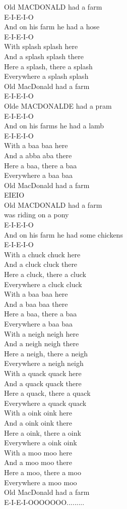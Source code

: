 \documentclass[a4paper,10pt]{article}
\begin{document}
Old MACDONALD had a farm \\
E-I-E-I-O \\
And on his farm he had a hose \\
E-I-E-I-O \\
With splash splash here \\
And a splash splash there \\
Here a splash, there a splash \\
Everywhere a splash splash \\
Old MacDonald had a farm \\
E-I-E-I-O \\

Olde MACDONALDE had a pram \\
E-I-E-I-O\\
And on his farms he had a lamb\\
E-I-E-I-O\\
With a baa baa here\\
And a abba aba there\\
Here a baa, there a baa\\
Everywhere a baa baa\\
Old MacDonald had a farm\\
EIEIO\\

Old MACDONALD had a farm\\
was riding on a pony\\
E-I-E-I-O\\
And on his farm he had some chickens\\
E-I-E-I-O\\
With a chuck chuck here\\
And a cluck cluck there\\
Here a cluck, there a cluck\\
Everywhere a cluck cluck\\
With a baa baa here\\
And a baa baa there\\
Here a baa, there a baa\\
Everywhere a baa baa\\
With a neigh neigh here\\
And a neigh neigh there\\
Here a neigh, there a neigh\\
Everywhere a neigh neigh\\
With a quack quack here\\
And a quack quack there\\
Here a quack, there a quack\\
Everywhere a quack quack\\
With a oink oink here\\
And a oink oink there\\
Here a oink, there a oink\\
Everywhere a oink oink\\
With a moo moo here\\
And a moo moo there\\
Here a moo, there a moo\\
Everywhere a moo moo\\

\enlargethispage{2em}
Old MacDonald had a farm\\
E-I-E-I-OOOOOOO.........\\
\end{document}
